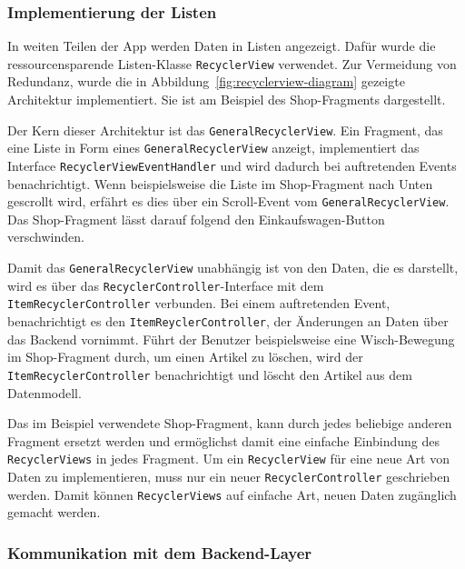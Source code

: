 \subsubsection{Implementierung der Listen}

In weiten Teilen der App werden Daten in Listen angezeigt.
Dafür wurde die ressourcensparende Listen-Klasse \texttt{RecyclerView} verwendet.
Zur Vermeidung von Redundanz, wurde die in Abbildung~\ref{fig:recyclerview-diagram} gezeigte Architektur implementiert.
Sie ist am Beispiel des Shop-Fragments dargestellt.

Der Kern dieser Architektur ist das \texttt{GeneralRecyclerView}.
Ein Fragment, das eine Liste in Form eines \texttt{GeneralRecyclerView} anzeigt, implementiert das Interface \texttt{RecyclerViewEventHandler} und wird dadurch bei auftretenden Events benachrichtigt.
Wenn beispielsweise die Liste im Shop-Fragment nach Unten gescrollt wird, erfährt es dies über ein Scroll-Event vom \texttt{GeneralRecyclerView}.
Das Shop-Fragment lässt darauf folgend den Einkaufswagen-Button verschwinden.

Damit das \texttt{GeneralRecyclerView} unabhängig ist von den Daten, die es darstellt, wird es über das \texttt{RecyclerController}-Interface mit dem \texttt{ItemRecyclerController} verbunden.
Bei einem auftretenden Event, benachrichtigt es den \texttt{ItemReyclerController}, der Änderungen an Daten über das Backend vornimmt.
Führt der Benutzer beispielsweise eine Wisch-Bewegung im Shop-Fragment durch, um einen Artikel zu löschen, wird der \texttt{ItemRecyclerController} benachrichtigt und löscht den Artikel aus dem Datenmodell.

Das im Beispiel verwendete Shop-Fragment, kann durch jedes beliebige anderen Fragment ersetzt werden und ermöglichst damit eine einfache Einbindung des \texttt{RecyclerViews} in jedes Fragment.
Um ein \texttt{RecyclerView} für eine neue Art von Daten zu implementieren, muss nur ein neuer \texttt{RecyclerController} geschrieben werden.
Damit können \texttt{RecyclerViews} auf einfache Art, neuen Daten zugänglich gemacht werden.


\subsubsection{Kommunikation mit dem Backend-Layer}

